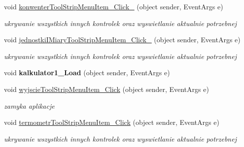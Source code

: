\begin{DoxyCompactItemize}
void \mbox{\hyperlink{classkalku__all__in__one_1_1_form1_a05c362c039f2c6613539dd2dbc84fce0}{konwenter\+Tool\+Strip\+Menu\+Item\+\_\+\+Click\+\_}} (object sender, Event\+Args e)
\begin{DoxyCompactList}\small\item\em ukrywanie wszystkich innych kontrolek oraz wyswietlanie aktualnie potrzebnej \end{DoxyCompactList}\item 
\mbox{\label{classkalku__all__in__one_1_1_form1_ae05555c64510477c8eeab3ad470115dd}} 
void \mbox{\hyperlink{classkalku__all__in__one_1_1_form1_ae05555c64510477c8eeab3ad470115dd}{jednostki\+I\+Miary\+Tool\+Strip\+Menu\+Item\+\_\+\+Click\+\_}} (object sender, Event\+Args e)
\begin{DoxyCompactList}\small\item\em ukrywanie wszystkich innych kontrolek oraz wyswietlanie aktualnie potrzebnej \end{DoxyCompactList}\item 
\mbox{\label{classkalku__all__in__one_1_1_form1_a934204460b0f20725102161f025803a9}} 
void {\bfseries kalkulator1\+\_\+\+Load} (object sender, Event\+Args e)
\item 
\mbox{\label{classkalku__all__in__one_1_1_form1_a86268b4e30d5a242cbe53da566b7feb4}} 
void \mbox{\hyperlink{classkalku__all__in__one_1_1_form1_a86268b4e30d5a242cbe53da566b7feb4}{wyjscie\+Tool\+Strip\+Menu\+Item\+\_\+\+Click}} (object sender, Event\+Args e)
\begin{DoxyCompactList}\small\item\em zamyka aplikacje \end{DoxyCompactList}\item 
\mbox{\label{classkalku__all__in__one_1_1_form1_aca0a347fa07bc3e5517c73c2cdb3d24c}} 
void \mbox{\hyperlink{classkalku__all__in__one_1_1_form1_aca0a347fa07bc3e5517c73c2cdb3d24c}{termometr\+Tool\+Strip\+Menu\+Item\+\_\+\+Click}} (object sender, Event\+Args e)
\begin{DoxyCompactList}\small\item\em ukrywanie wszystkich innych kontrolek oraz wyswietlanie aktualnie potrzebnej \end{DoxyCompactList}\item 

\end{DoxyCompactItemize}
